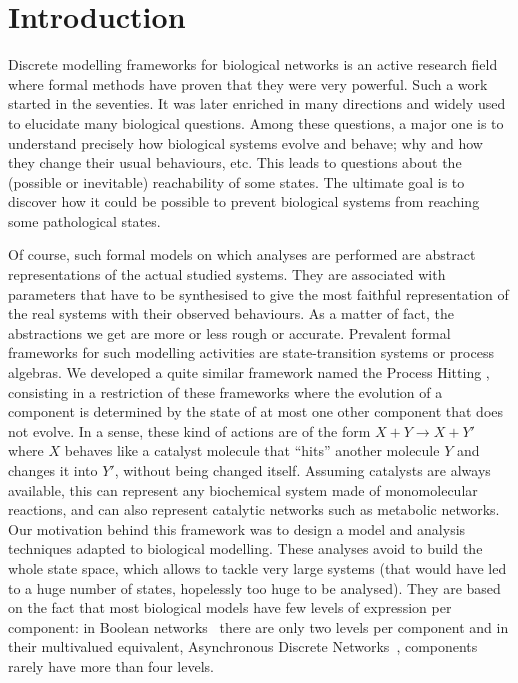 \section{Introduction}
\label{sec:intro}

Discrete modelling frameworks for biological networks is an active research field where formal methods have proven that they were very powerful.
Such a work started in the seventies.
It was later enriched in many directions and widely used to elucidate many biological questions.
Among these questions, a major one is to understand precisely how biological systems evolve and behave; why and how they change their usual behaviours, etc.
This leads to questions about the (possible or inevitable) reachability of some states.
The ultimate goal is to discover how it could be possible to prevent biological systems from reaching some pathological states.

Of course, such formal models on which analyses are performed are abstract representations of the actual studied systems.
They are associated with parameters that have to be synthesised %
to give the most faithful representation of the real systems with their observed behaviours.
As a matter of fact, the abstractions we get are more or less rough or accurate.
Prevalent formal frameworks for such modelling activities are state-transition systems or process algebras. %
We developed a quite similar framework named the Process Hitting \cite{PMR10-TCSB},
consisting in a restriction of these frameworks where the evolution of a component is determined by the state of at most one other component that does not evolve.
In a sense, these kind of actions are of the form $X + Y \rightarrow X + Y'$ where $X$ behaves like a catalyst molecule that “hits” another molecule $Y$ and changes it into $Y'$, without being changed itself.
Assuming catalysts are always available, this can represent any biochemical system made of monomolecular reactions, and can also represent catalytic networks such as metabolic networks.
Our motivation behind this framework was to design a model and analysis techniques adapted to biological modelling.
These analyses avoid to build the whole state space, which allows to tackle very large systems (that would have led to a huge number of states, hopelessly too huge to be analysed).
They are based on the fact that most biological models have few levels of expression per component:
in Boolean networks~\cite{kauffman69,Thomas73} there are only two levels per component and in their multivalued equivalent, Asynchronous Discrete Networks~\cite{deJong02}, components rarely have more than four levels.

